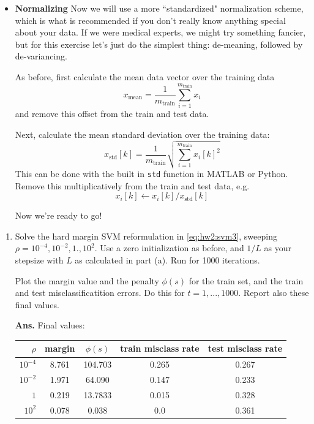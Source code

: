 \documentclass{article}
\newcommand{\showsolution}[1]{\textbf{Ans.} \;#1}
\begin{document}
\begin{enumerate}
\begin{enumerate}
\begin{itemize}
\item \textbf{Normalizing} Now we will use a more ``standardized" normalization scheme, which is what is recommended if you don't really know anything special about your data. If we were medical experts, we might try something fancier, but for this exercise let's just do the simplest thing: de-meaning, followed by de-variancing. 

As before, first calculate the mean data vector over the training data
\[
x_{\text{mean}} = \frac{1}{m_{\text{train}}} \sum_{i=1}^{m_\text{train}} x_i
\]
and remove this offset from the train and test data.

Next, calculate the mean standard deviation over the training data:
\[
x_{\text{std}}[k] = \frac{1}{m_{\text{train}}} \sqrt{\sum_{i=1}^{m_\text{train}} x_i[k]^2}
\]
This can be done with the built in \texttt{std} function in MATLAB or Python.
Remove this multiplicatively from the train and test data, e.g.
\[
x_i[k] \leftarrow x_i[k] /x_{\text{std}}[k] 
\]

Now we're ready to go!

\end{itemize}

\begin{enumerate}
\item Solve the hard margin SVM reformulation in \eqref{eq:hw2:svm3}, sweeping $\rho = 10^{-4}, 10^{-2}, 1., 10^2$. Use a zero initialization as before, and $1/L$ as your stepsize with $L$ as calculated in part (a). Run for 1000 iterations.

Plot the margin value and the penalty $\phi(s)$ for the train set, and the train and test misclassificatition errors. Do this for $t = 1,...,1000$. Report also these final values.

\showsolution{
Final values:

\begin{tabular}{r|cccc}
$\rho$& margin & $\phi(s)$ & train misclass rate & test misclass rate \\\hline
$10^{-4}$& 8.761 &104.703 &0.265 &0.267\\
$10^{-2}$& 1.971 &64.090& 0.147& 0.233\\
$1$& 0.219 &13.7833 &0.015& 0.328\\
$10^2$& 0.078 &0.038 &0.0 &0.361
\end{tabular}

}
\end{enumerate}
\end{enumerate}
\end{enumerate}
\end{document}
